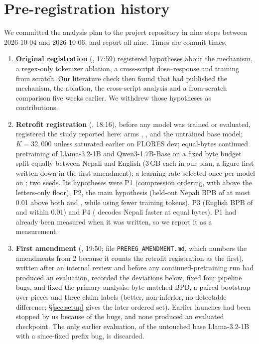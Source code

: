 \section{Pre-registration history}
\label{app:prereg}

We committed the analysis plan to the project repository in nine steps between 2026-10-04 and 2026-10-06\tzlabel{}, and report all nine. Times are commit times.

\begin{enumerate}
  \setlength\itemsep{0pt}
  \item \textbf{Original registration} (\commitA{}, 17:59) registered hypotheses about the mechanism, a regex-only tokenizer ablation, a cross-script dose--response and training from scratch. Our literature check then found that \citet{regmi2026vowel} had published the mechanism, the ablation, the cross-script analysis and a from-scratch comparison five weeks earlier. We withdrew those hypotheses as contributions.
  \item \textbf{Retrofit registration} (\commitB{}, 18:16), before any model was trained or evaluated, registered the study reported here: arms \RO{}, \RI{}, \RII{} and the untrained base model; $K{=}32{,}000$ unless \RII{} saturated earlier on FLORES dev; equal-bytes continued pretraining of Llama-3.2-1B and Qwen3-1.7B-Base on a fixed byte budget split equally between Nepali and English (3\,GB each in our plan, a figure first written down in the first amendment); a learning rate selected once per model on \RO{}; two seeds. Its hypotheses were P1 (compression ordering, with \RI{} above the letters-only floor), P2, the main hypothesis (held-out Nepali BPB of \RII{} at most 0.01 above both \RI{} and \RO{}, while using fewer training tokens), P3 (English BPB of \RII{} and \RO{} within 0.01) and P4 (\RII{} decodes Nepali faster at equal bytes). P1 had already been measured when it was written, so we report it as a measurement.
  \item \textbf{First amendment} (\commitC{}, 19:50; file \texttt{PREREG\_AMENDMENT.md}, which numbers the amendments from 2 because it counts the retrofit registration as the first), written after an internal review and before any continued-pretraining run had produced an evaluation, recorded the deviations below, fixed four pipeline bugs, and fixed the primary analysis: byte-matched BPB, a paired bootstrap over pieces and three claim labels (better, non-inferior, no detectable difference; \S\ref{sec:setup} gives the later ordered set). Earlier launches had been stopped by us because of the bugs, and none produced an evaluated checkpoint. The only earlier evaluation, of the untouched base Llama-3.2-1B with a since-fixed prefix bug, is discarded.

\end{enumerate}
